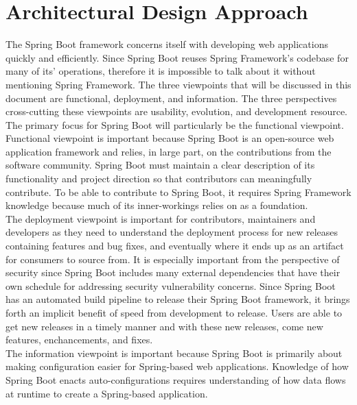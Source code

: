 \section{Architectural Design Approach}

The Spring Boot framework concerns itself with developing web applications quickly and efficiently. Since Spring Boot reuses Spring Framework's codebase for many of its' operations, therefore it is impossible to talk about it without mentioning Spring Framework. The three viewpoints that will be discussed in this document are functional, deployment, and information. The three perspectives cross-cutting these viewpoints are usability, evolution, and development resource.\\

The primary focus for Spring Boot will particularly be the functional viewpoint. Functional viewpoint is important because Spring Boot is an open-source web application framework and relies, in large part, on the contributions from the software community. Spring Boot must maintain a clear description of its functionality and project direction so that contributors can meaningfully contribute. To be able to contribute to Spring Boot, it requires Spring Framework knowledge because much of its inner-workings relies on as a foundation.\\

The deployment viewpoint is important for contributors, maintainers and developers as they need to understand the deployment process for new releases containing features and bug fixes, and eventually where it ends up as an artifact for consumers to source from. It is especially important from the perspective of security since Spring Boot includes many external dependencies that have their own schedule for addressing security vulnerability concerns. Since Spring Boot has an automated build pipeline to release their Spring Boot framework, it brings forth an implicit benefit of speed from development to release. Users are able to get new releases in a timely manner and with these new releases, come new features, enchancements, and fixes.\\

The information viewpoint is important because Spring Boot is primarily about making configuration easier for Spring-based web applications. Knowledge of how Spring Boot enacts auto-configurations requires understanding of how data flows at runtime to create a Spring-based application.

